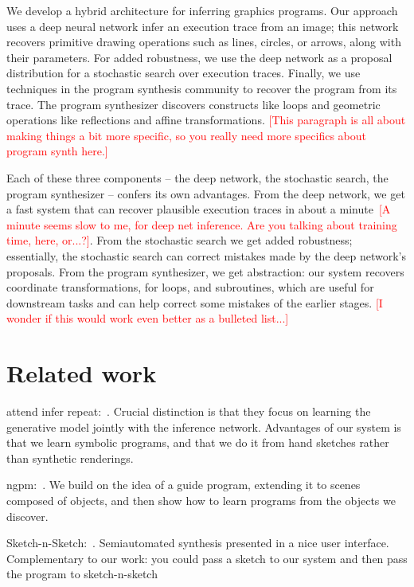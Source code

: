 \documentclass{article}
\newcommand{\remark}[1]{\textcolor{red}{[#1]}}
\begin{document}
We develop a hybrid architecture for inferring graphics programs.  Our
approach uses a deep neural network infer an execution trace from an
image; this network recovers primitive drawing operations such as
lines, circles, or arrows, along with their parameters. For added
robustness, we use the deep network as a proposal distribution for a
stochastic search over execution traces.  Finally, we use techniques
in the program synthesis community to recover the program from its
trace.  The program synthesizer discovers constructs like loops and
geometric operations like reflections and affine transformations.
\remark{This paragraph is all about making things a bit more specific,
  so you really need more specifics about program synth here.}

Each of these three components -- the deep network, the stochastic
search, the program synthesizer -- confers its own advantages. From
the deep network, we get a fast system that can recover plausible
execution traces in about a minute~\remark{A minute seems slow to me, for deep net inference. Are you talking about training time, here, or...?}. From the stochastic search we get
added robustness; essentially, the stochastic search can correct
mistakes made by the deep network's proposals.  From the program
synthesizer, we get abstraction: our system recovers coordinate
transformations, for loops, and subroutines, which are useful for
downstream tasks and can help correct some mistakes of the earlier stages.
\remark{I wonder if this would work even better as a bulleted list...}


\section{Related work}
attend infer repeat:~\cite{eslami1603attend}. Crucial distinction is
that they focus on learning the generative model jointly with the
inference network. Advantages of our system is that we learn symbolic
programs, and that we do it from hand sketches rather than synthetic
renderings.

ngpm:~\cite{ritchie2016neurally}. We build on the idea of a guide program, extending it to scenes composed of objects, and then show how to learn programs from the objects we discover.

Sketch-n-Sketch:~\cite{Hempel:2016:SSP:2984511.2984575}. Semiautomated synthesis presented in a nice user interface. Complementary to our work: you could pass a sketch to our system and then pass the program to sketch-n-sketch
\end{document}
